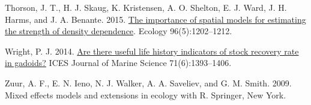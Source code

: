 \documentclass[
]{article}
\newlength{\cslhangindent}
\newlength{\cslentryspacingunit} %
\newenvironment{CSLReferences}[2] %
 {%
  \setlength{\parindent}{0pt}
  \ifodd #1
  \let\oldpar\par
  \def\par{\hangindent=\cslhangindent\oldpar}
  \fi
  \setlength{\parskip}{#2\cslentryspacingunit}
 }%
 {}
\begin{document}
\begin{CSLReferences}{1}{0}
\leavevmode{}%
Thorson, J. T., H. J. Skaug, K. Kristensen, A. O. Shelton, E. J. Ward, J. H. Harms, and J. A. Benante. 2015. \href{https://doi.org/10.1890/14-0739.1}{The importance of spatial models for estimating the strength of density dependence}. Ecology 96(5):1202--1212.

\leavevmode{}%
Wright, P. J. 2014. \href{https://doi.org/10.1093/icesjms/fsu100}{Are there useful life history indicators of stock recovery rate in gadoids?} ICES Journal of Marine Science 71(6):1393--1406.

\leavevmode{}%
Zuur, A. F., E. N. Ieno, N. J. Walker, A. A. Saveliev, and G. M. Smith. 2009. Mixed effects models and extensions in ecology with {R}. Springer, New York.

\end{CSLReferences}
\end{document}

